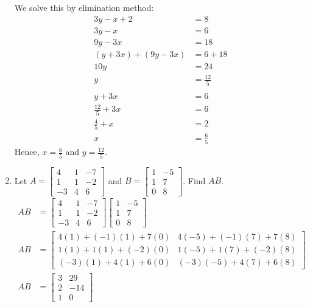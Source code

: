 \begin{example}
\begin{enumerate}
            We solve this by elimination method:
            \begin{align*}
                3y - x + 2 &= 8 \\
                3y - x &= 6 \\
                9y - 3x &= 18 \\
                (y + 3x) + (9y - 3x) &= 6 + 18 \\
                10y &= 24 \\
                y &= \frac{12}{5} \\\\
                y + 3x &= 6 \\
                \frac{12}{5} + 3x &= 6 \\
                \frac{4}{5} + x &= 2 \\
                x &= \frac{6}{5}
            \end{align*}
            Hence, \(x = \frac{6}{5}\) and \(y = \frac{12}{5}\).

            \item Let \(A = \begin{bmatrix}
                4 & 1 & -7 \\ 1 & 1 & -2 \\ -3 & 4 & 6
            \end{bmatrix}\) and \(B = \begin{bmatrix}
                1 & -5 \\ 1 & 7 \\ 0 & 8
            \end{bmatrix}\). Find \(AB\).
            \begin{align*}
                AB &= \begin{bmatrix}
                    4 & 1 & -7 \\ 1 & 1 & -2 \\ -3 & 4 & 6
                \end{bmatrix}\begin{bmatrix}
                    1 & -5 \\ 1 & 7 \\ 0 & 8
                \end{bmatrix} \\
                AB &= \begin{bmatrix}
                    4(1) + (-1)(1) + 7(0) & 4(-5) + (-1)(7) + 7(8) \\
                    1(1) + 1(1) + (-2)(0) & 1(-5) + 1(7) + (-2)(8) \\
                    (-3)(1) + 4(1) + 6(0) & (-3)(-5) + 4(7) + 6(8)
                \end{bmatrix} \\
                AB &= \begin{bmatrix}
                    3 & 29 \\ 2 & -14 \\ 1 & 0
                \end{bmatrix}
            \end{align*}


\end{enumerate}
\end{example}
